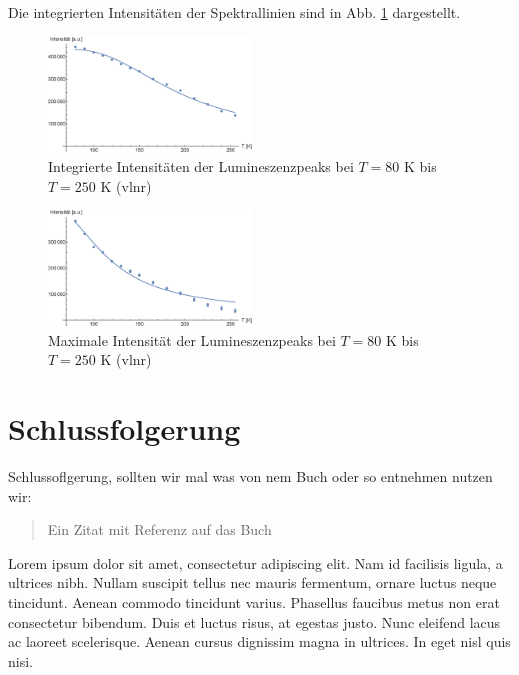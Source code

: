 \documentclass[aps,twocolumn,secnumarabic,nobalancelastpage,amsmath,amssymb,
nofootinbib,superscriptaddress]{revtex4-1}
\begin{document}
Die integrierten Intensitäten der Spektrallinien sind in Abb. \ref{fig:intInt} dargestellt.

\begin{figure}[h]
  \centering
  \includegraphics[width=0.48\textwidth]{../Messung/integrintenstempfit.eps}
  \caption{\label{fig:intInt}Integrierte Intensitäten der Lumineszenzpeaks bei $T=80\text{ K}$ bis $T=250\text{ K}$ (vlnr)}
\end{figure}

\begin{figure}[h]
  \centering
  \includegraphics[width=0.48\textwidth]{../Messung/maxintenstempfit.eps}
  \caption{\label{fig:maxInt}Maximale Intensität der Lumineszenzpeaks bei $T=80\text{ K}$ bis $T=250\text{ K}$ (vlnr)}
\end{figure}

\section{Schlussfolgerung}

Schlussoflgerung, sollten wir mal was von nem Buch oder so entnehmen nutzen wir:


\begin{quote}
  Ein Zitat mit Referenz auf das Buch \cite{melissinos1966}
\end{quote}

Lorem ipsum dolor sit amet, consectetur adipiscing elit. Nam id facilisis ligula,
a ultrices nibh. Nullam suscipit tellus nec mauris fermentum, ornare luctus neque
tincidunt. Aenean commodo tincidunt varius. Phasellus faucibus metus non erat
consectetur bibendum. Duis et luctus risus, at egestas justo. Nunc eleifend lacus
ac laoreet scelerisque. Aenean cursus dignissim magna in ultrices. In eget nisl
quis nisi.
\end{document}

